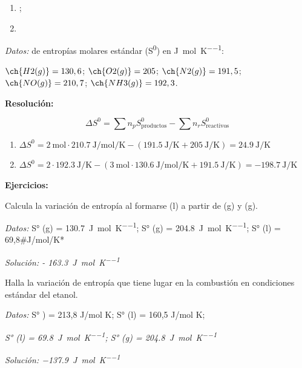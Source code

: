 \documentclass[
  spanish,
]{article}
\providecommand{\tightlist}{%
  \setlength{\itemsep}{0pt}\setlength{\parskip}{0pt}}
\begin{document}
\begin{enumerate}
\def\labelenumi{\alph{enumi})}
\item
  ;
\item
\end{enumerate}

\emph{Datos:} de entropías molares estándar (S\textsuperscript{0}) en
\unit{\J\per\mol\per\K}:

\(\ch{H2 (g)} = 130,6\); \(\ch{O2 (g)} = 205\); \(\ch{N2 (g)} = 191,5\);
\(\ch{NO (g)} = 210,7\); \(\ch{NH3 (g)} = 192,3\).

\textbf{Resolución:}

\[\Delta S^0 = \sum n_p S_\text{productos}^0 - \sum n_r S_\text{reactivos}^0\]

\begin{enumerate}
\def\labelenumi{\alph{enumi})}
\tightlist
\item
  \(\Delta S^0 = \qty{2}{\mol} \cdot \qty{210,7}{\J\per\mol\per\K} - ( \qty{191,5}{\J\per\K} + \qty{205}{\J\per\K} ) = \qty{24,9}{\J\per\K}\)
\item
  \(\Delta S^0 = 2 \cdot \qty{192,3}{\J\per\K} - (\qty{3}{\mol} \cdot \qty{130,6}{\J\per\mol\per\K} + \qty{191,5}{\J\per\K} ) = \qty{-198,7}{\J\per\K}\)
\end{enumerate}

\textbf{Ejercicios:}

\begin{exercise}Calcula la variación de entropía al formarse 
(l) a partir de  (g) y  (g).

\emph{Datos:} S°  (g) = \qty{130,7}{\J\per\mol\per\K}; S° 
(g) = \qty{204,8}{\J\per\mol\per\K}; S°  (l) = 69,8\#J/mol/K*

\emph{Solución: - \qty{163,3}{\J\per\mol\per\K}}\end{exercise}

\begin{exercise}Halla la variación de entropía que tiene lugar en la
combustión en condiciones estándar del etanol.

\emph{Datos:} S° ) = 213,8 J/mol K; S°  (l) =
160,5 J/mol K;

\emph{S°  (l) = \qty{69,8}{\J\per\mol\per\K}; S°  (g) =
\qty{204,8}{\J\per\mol\per\K}}

\emph{Solución: \qty{-137,9}{\J\per\mol\per\K}}\end{exercise}
\end{document}
